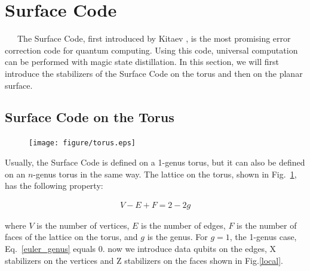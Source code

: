 \documentclass[a4paper,11pt]{ltjsarticle}
\begin{document}
\section{Surface Code}{
    \ \ \ The Surface Code, first introduced by Kitaev \cite{kitaev1997}, is the most promising error correction code for quantum computing. Using this code, universal computation can be performed with magic state distillation. In this section, we will first introduce the stabilizers of the Surface Code on the torus and then on the planar surface.

    \subsection{Surface Code on the Torus}{

        \begin{figure}[h]
            \centering
            \texttt{[image: figure/torus.eps]}
            \vspace{0pt}\caption{}
            \label{torus}
            \vspace{-15pt}
        \end{figure}

        Usually, the Surface Code is defined on a 1-genus torus, but it can also be defined on an $n$-genus torus in the same way. The lattice on the torus, shown in Fig.~\ref{torus}, has the following property:

        \begin{align}\label{euler_genus}
            V-E+F=2-2g
        \end{align}
        
        where $V$ is the number of vertices, $E$ is the number of edges, $F$ is the number of faces of the lattice on the torus, and $g$ is the genus. For $g = 1$, the 1-genus case, Eq.~\ref{euler_genus} equals $0$. now we introduce data qubits on the edges, X stabilizers on the vertices and Z stabilizers on the faces shown in Fig.\ref{local}.

}}
\end{document}
